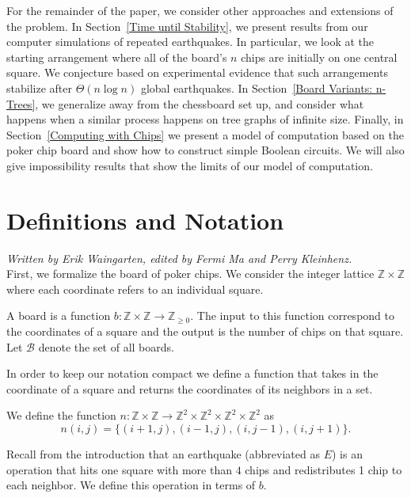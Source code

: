 \documentclass[runningheads,a4paper]{llncs}
\begin{document}
For the remainder of the paper, we consider other approaches and extensions of the problem. 
In  Section~\ref{Time until Stability}, we present results from our computer simulations of repeated earthquakes. In particular, we look at the starting arrangement where all of the board's $n$ chips are initially on one central square.
We conjecture based on experimental evidence that such arrangements stabilize after $\Theta(n \log n)$ global earthquakes. 
In Section~\ref{Board Variants: n-Trees}, we generalize away from the chessboard set up, and consider what happens when a similar process happens on tree graphs of infinite size. 
Finally, in Section~\ref{Computing with Chips} we present a model of computation based on the poker chip board and show how to construct simple Boolean circuits. We will also give impossibility results that show the limits of our model of computation.
\section{Definitions and Notation}
\label{Definitions and Notation}

\emph{Written by Erik Waingarten, edited by Fermi Ma and Perry Kleinhenz.}\\

First, we formalize the board of poker chips. We consider the integer lattice $\mathbb{Z} \times \mathbb{Z}$ where each coordinate refers to an individual square.

\begin{definition} A board is a function $b: \mathbb{Z} \times \mathbb{Z} \to \mathbb{Z}_{\geq 0}$.
The input to this function correspond to the coordinates of a square and the output is the number of chips on that square. Let $\mathcal{B}$ denote the set of all boards.
\end{definition}

In order to keep our notation compact we define a function that takes in the coordinate of a square and returns the coordinates of its neighbors in a set. 
\begin{definition}
We define the function $n: \mathbb{Z} \times \mathbb{Z} \rightarrow \mathbb{Z}^2 \times \mathbb{Z}^2 \times \mathbb{Z}^2 \times \mathbb{Z}^2 $ as 
\begin{equation}
n(i,j) = \{ (i+1, j), (i-1, j), (i, j-1), (i, j+1) \}.
\end{equation}
\end{definition}

Recall from the introduction that an earthquake (abbreviated as $E$) is an operation that hits one square with more than $4$ chips and redistributes 1 chip to each neighbor. We define this operation in terms of $b$.
\end{document}
